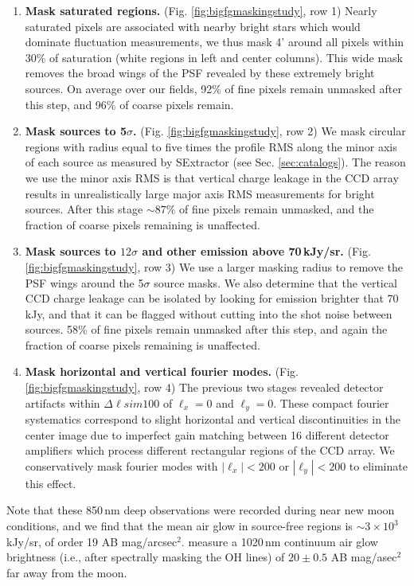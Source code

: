 \documentclass{emulateapj}
\begin{document}
\begin{enumerate}
	\item \textbf{Mask saturated regions.} (Fig. \ref{fig:bigfgmaskingstudy}, row 1) Nearly saturated pixels are associated with nearby bright stars which would dominate fluctuation measurements, we thus mask 4' around all pixels within 30\% of saturation (white regions in left and center columns). This wide mask removes the broad wings of the PSF revealed by these extremely bright sources. On average over our fields, 92\% of fine pixels remain unmasked after this step, and 96\% of coarse pixels remain.
	\item \textbf{Mask sources to 5$\sigma$.} (Fig. \ref{fig:bigfgmaskingstudy}, row 2) We mask circular regions with radius equal to five times the profile RMS along the minor axis of each source as measured by SExtractor (see Sec. \ref{sec:catalogs}). The reason we use the minor axis RMS is that vertical charge leakage in the CCD array results in unrealistically large major axis RMS measurements for bright sources. After this stage $\sim87$\% of fine pixels remain unmasked, and the fraction of coarse pixels remaining is unaffected.
	\item \textbf{Mask sources to $12\sigma$ and other emission above 70\,kJy/sr.} (Fig. \ref{fig:bigfgmaskingstudy}, row 3) We use a larger masking radius to remove the PSF wings around the 5$\sigma$ source masks. We also determine that the vertical CCD charge leakage can be isolated by looking for emission brighter that 70\,kJy, and that it can be flagged without cutting into the shot noise between sources. 58\% of fine pixels remain unmasked after this step, and again the fraction of coarse pixels remaining is unaffected.
	\item \textbf{Mask horizontal and vertical fourier modes.} (Fig. \ref{fig:bigfgmaskingstudy}, row 4) The previous two stages revealed detector artifacts within $\Delta\ell sim100$ of $\ell_x=0$ and $\ell_y=0$. These compact fourier systematics correspond to slight horizontal and vertical discontinuities in the center image due to imperfect gain matching between 16 different detector amplifiers which process different rectangular regions of the CCD array. We conservatively mask fourier modes with $|\ell_x|<200$ or $|\ell_y|<200$ to eliminate this effect.
\end{enumerate}

Note that these 850\,nm deep observations were recorded during near new moon conditions, and we find that the mean air glow in source-free regions is $\sim3\times10^3$ kJy/sr, of order 19 AB mag/arcsec$^2$. \citet{sullivan12} measure a 1020\,nm continuum air glow brightness (i.e., after spectrally masking the OH lines) of $20\pm0.5$ AB mag/asec$^2$ far away from the moon. 
\end{document}
